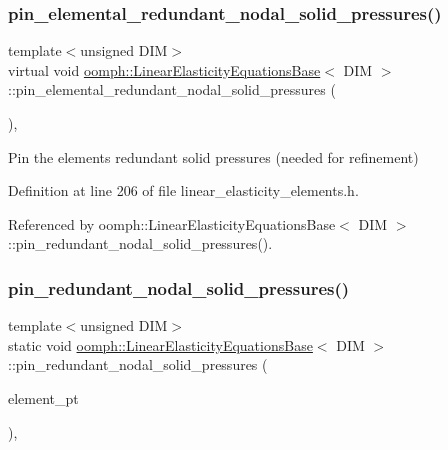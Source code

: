 \subsubsection{\texorpdfstring{pin\+\_\+elemental\+\_\+redundant\+\_\+nodal\+\_\+solid\+\_\+pressures()}{pin\_elemental\_redundant\_nodal\_solid\_pressures()}}
{\footnotesize\ttfamily template$<$unsigned D\+IM$>$ \\
virtual void \hyperlink{classoomph_1_1LinearElasticityEquationsBase}{oomph\+::\+Linear\+Elasticity\+Equations\+Base}$<$ D\+IM $>$\+::pin\+\_\+elemental\+\_\+redundant\+\_\+nodal\+\_\+solid\+\_\+pressures (\begin{DoxyParamCaption}{ }\end{DoxyParamCaption})\hspace{0.3cm}{\ttfamily [inline]}, {\ttfamily [virtual]}}



Pin the element\textquotesingle{}s redundant solid pressures (needed for refinement) 



Definition at line 206 of file linear\+\_\+elasticity\+\_\+elements.\+h.



Referenced by oomph\+::\+Linear\+Elasticity\+Equations\+Base$<$ D\+I\+M $>$\+::pin\+\_\+redundant\+\_\+nodal\+\_\+solid\+\_\+pressures().

\mbox{\label{classoomph_1_1LinearElasticityEquationsBase_ae4868b297fb79e9aa0e33a898efa51bb}} 
\subsubsection{\texorpdfstring{pin\+\_\+redundant\+\_\+nodal\+\_\+solid\+\_\+pressures()}{pin\_redundant\_nodal\_solid\_pressures()}}
{\footnotesize\ttfamily template$<$unsigned D\+IM$>$ \\
static void \hyperlink{classoomph_1_1LinearElasticityEquationsBase}{oomph\+::\+Linear\+Elasticity\+Equations\+Base}$<$ D\+IM $>$\+::pin\+\_\+redundant\+\_\+nodal\+\_\+solid\+\_\+pressures (\begin{DoxyParamCaption}\item[{const \hyperlink{classoomph_1_1Vector}{Vector}$<$ \hyperlink{classoomph_1_1GeneralisedElement}{Generalised\+Element} $\ast$$>$ \&}]{element\+\_\+pt }\end{DoxyParamCaption})\hspace{0.3cm}{\ttfamily [inline]}, {\ttfamily [static]}}



